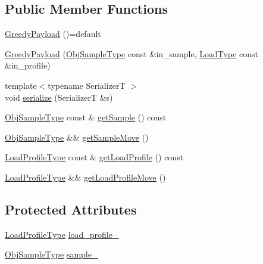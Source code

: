 \subsection*{Public Member Functions}
\begin{DoxyCompactItemize}
\item 
\hyperlink{structvt_1_1vrt_1_1collection_1_1lb_1_1_greedy_payload_ad4da82c6ba27244f3258f8a4e76871f8}{Greedy\+Payload} ()=default
\item 
\hyperlink{structvt_1_1vrt_1_1collection_1_1lb_1_1_greedy_payload_a7de799b4cb1eb3681b3a7aba4b60f8d0}{Greedy\+Payload} (\hyperlink{structvt_1_1vrt_1_1collection_1_1lb_1_1_greedy_l_b_types_a467f8a79d0785fca5fc95bd5c0f406b9}{Obj\+Sample\+Type} const \&in\+\_\+sample, \hyperlink{structvt_1_1vrt_1_1collection_1_1lb_1_1_greedy_l_b_types_a9fe8829bc0c92e88ddf9d149233a54f4}{Load\+Type} const \&in\+\_\+profile)
\item 
{\footnotesize template$<$typename SerializerT $>$ }\\void \hyperlink{structvt_1_1vrt_1_1collection_1_1lb_1_1_greedy_payload_a7b28a57071b54698609dd94da9cf9c0e}{serialize} (SerializerT \&s)
\item 
\hyperlink{structvt_1_1vrt_1_1collection_1_1lb_1_1_greedy_l_b_types_a467f8a79d0785fca5fc95bd5c0f406b9}{Obj\+Sample\+Type} const  \& \hyperlink{structvt_1_1vrt_1_1collection_1_1lb_1_1_greedy_payload_aeb49fabc4eb3b15bf698309c651abafe}{get\+Sample} () const
\item 
\hyperlink{structvt_1_1vrt_1_1collection_1_1lb_1_1_greedy_l_b_types_a467f8a79d0785fca5fc95bd5c0f406b9}{Obj\+Sample\+Type} \&\& \hyperlink{structvt_1_1vrt_1_1collection_1_1lb_1_1_greedy_payload_a294dcb18ec60ae644f5a5112bbd2987a}{get\+Sample\+Move} ()
\item 
\hyperlink{structvt_1_1vrt_1_1collection_1_1lb_1_1_greedy_l_b_types_a8af324cd88e83727178631e4d1478932}{Load\+Profile\+Type} const  \& \hyperlink{structvt_1_1vrt_1_1collection_1_1lb_1_1_greedy_payload_a9c4cc1760d2a176ea190cd055b121ec2}{get\+Load\+Profile} () const
\item 
\hyperlink{structvt_1_1vrt_1_1collection_1_1lb_1_1_greedy_l_b_types_a8af324cd88e83727178631e4d1478932}{Load\+Profile\+Type} \&\& \hyperlink{structvt_1_1vrt_1_1collection_1_1lb_1_1_greedy_payload_a2f16402fb9c14fb36a378985919b35f0}{get\+Load\+Profile\+Move} ()
\end{DoxyCompactItemize}
\subsection*{Protected Attributes}
\begin{DoxyCompactItemize}
\item 
\hyperlink{structvt_1_1vrt_1_1collection_1_1lb_1_1_greedy_l_b_types_a8af324cd88e83727178631e4d1478932}{Load\+Profile\+Type} \hyperlink{structvt_1_1vrt_1_1collection_1_1lb_1_1_greedy_payload_afb95c0d993a5e23a1b66d7c411d5a415}{load\+\_\+profile\+\_\+}
\item 
\hyperlink{structvt_1_1vrt_1_1collection_1_1lb_1_1_greedy_l_b_types_a467f8a79d0785fca5fc95bd5c0f406b9}{Obj\+Sample\+Type} \hyperlink{structvt_1_1vrt_1_1collection_1_1lb_1_1_greedy_payload_a06b7ae7ccf00d3d7afcf7398e632ca9c}{sample\+\_\+}
\end{DoxyCompactItemize}
